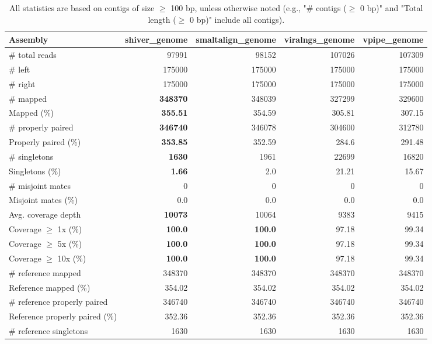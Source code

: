 \documentclass[12pt,a4paper]{article}
\begin{document}
\begin{table}[ht]
\begin{center}
\caption{All statistics are based on contigs of size $\geq$ 100 bp, unless otherwise noted (e.g., "\# contigs ($\geq$ 0 bp)" and "Total length ($\geq$ 0 bp)" include all contigs).}
\begin{tabular}{|l*{4}{|r}|}
\hline
Assembly & shiver\_genome & smaltalign\_genome & viralngs\_genome & vpipe\_genome \\ \hline
\# total reads & 97991 & 98152 & 107026 & 107309 \\ \hline
\# left & 175000 & 175000 & 175000 & 175000 \\ \hline
\# right & 175000 & 175000 & 175000 & 175000 \\ \hline
\# mapped & {\bf 348370} & 348039 & 327299 & 329600 \\ \hline
Mapped (\%) & {\bf 355.51} & 354.59 & 305.81 & 307.15 \\ \hline
\# properly paired & {\bf 346740} & 346078 & 304600 & 312780 \\ \hline
Properly paired (\%) & {\bf 353.85} & 352.59 & 284.6 & 291.48 \\ \hline
\# singletons & {\bf 1630} & 1961 & 22699 & 16820 \\ \hline
Singletons (\%) & {\bf 1.66} & 2.0 & 21.21 & 15.67 \\ \hline
\# misjoint mates & 0 & 0 & 0 & 0 \\ \hline
Misjoint mates (\%) & 0.0 & 0.0 & 0.0 & 0.0 \\ \hline
Avg. coverage depth & {\bf 10073} & 10064 & 9383 & 9415 \\ \hline
Coverage $\geq$ 1x (\%) & {\bf 100.0} & {\bf 100.0} & 97.18 & 99.34 \\ \hline
Coverage $\geq$ 5x (\%) & {\bf 100.0} & {\bf 100.0} & 97.18 & 99.34 \\ \hline
Coverage $\geq$ 10x (\%) & {\bf 100.0} & {\bf 100.0} & 97.18 & 99.34 \\ \hline
\# reference mapped & 348370 & 348370 & 348370 & 348370 \\ \hline
Reference mapped (\%) & 354.02 & 354.02 & 354.02 & 354.02 \\ \hline
\# reference properly paired & 346740 & 346740 & 346740 & 346740 \\ \hline
Reference properly paired (\%) & 352.36 & 352.36 & 352.36 & 352.36 \\ \hline
\# reference singletons & 1630 & 1630 & 1630 & 1630 \\ \hline

\end{tabular}
\end{center}
\end{table}
\end{document}

